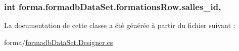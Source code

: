 \subsubsection[{\texorpdfstring{salles\+\_\+id}{salles_id}}]{\setlength{\rightskip}{0pt plus 5cm}int forma.\+formadb\+Data\+Set.\+formations\+Row.\+salles\+\_\+id\hspace{0.3cm}{\ttfamily [get]}, {\ttfamily [set]}}\hypertarget{classforma_1_1formadb_data_set_1_1formations_row_a5529e8da900248d372c9e8f4a8a2a77a}{}\label{classforma_1_1formadb_data_set_1_1formations_row_a5529e8da900248d372c9e8f4a8a2a77a}


La documentation de cette classe a été générée à partir du fichier suivant \+:\begin{DoxyCompactItemize}
\item 
forma/\hyperlink{formadb_data_set_8_designer_8cs}{formadb\+Data\+Set.\+Designer.\+cs}\end{DoxyCompactItemize}
